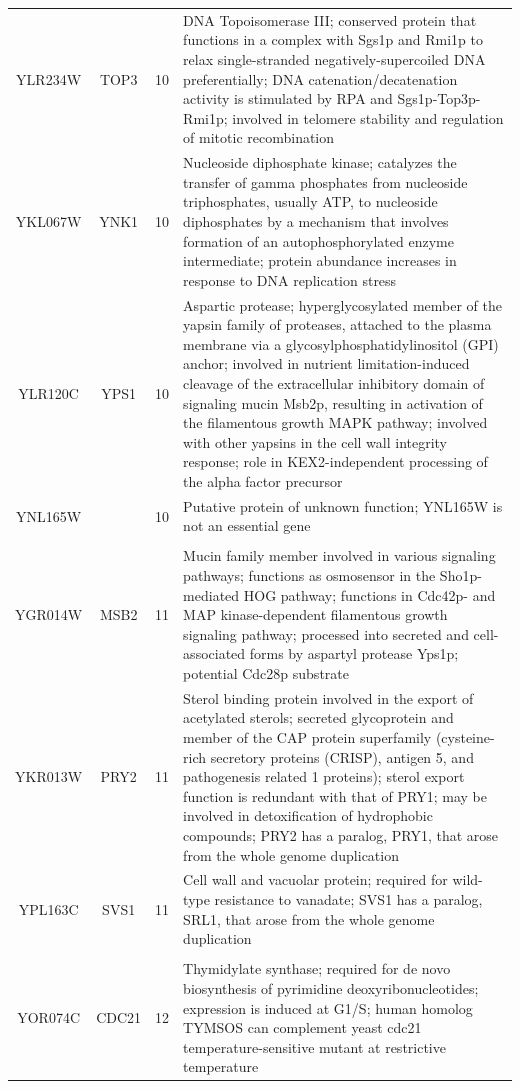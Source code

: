 \documentclass[]{article}
\begin{document}
\begin{longtable}{@{\extracolsep{3pt}} cccp{85mm}}
YLR234W & TOP3 & 10 & DNA Topoisomerase III; conserved protein that functions in a complex with Sgs1p and Rmi1p to relax single-stranded negatively-supercoiled DNA preferentially; DNA catenation/decatenation activity is stimulated by RPA and Sgs1p-Top3p-Rmi1p; involved in telomere stability and regulation of mitotic recombination \\ 
YKL067W & YNK1 & 10 & Nucleoside diphosphate kinase; catalyzes the transfer of gamma phosphates from nucleoside triphosphates, usually ATP, to nucleoside diphosphates by a mechanism that involves formation of an autophosphorylated enzyme intermediate; protein abundance increases in response to DNA replication stress \\ 
YLR120C & YPS1 & 10 & Aspartic protease; hyperglycosylated member of the yapsin family of proteases, attached to the plasma membrane via a glycosylphosphatidylinositol (GPI) anchor; involved in nutrient limitation-induced cleavage of the extracellular inhibitory domain of signaling mucin Msb2p, resulting in activation of the filamentous growth MAPK pathway; involved with other yapsins in the cell wall integrity response; role in KEX2-independent processing of the alpha factor precursor \\ 
YNL165W &  & 10 & Putative protein of unknown function; YNL165W is not an essential gene \\   \hline \\ [-1.8ex] 
YGR014W & MSB2 & 11 & Mucin family member involved in various signaling pathways; functions as osmosensor in the Sho1p-mediated HOG pathway; functions in Cdc42p- and MAP kinase-dependent filamentous growth signaling pathway; processed into secreted and cell-associated forms by aspartyl protease Yps1p; potential Cdc28p substrate \\ 
YKR013W & PRY2 & 11 & Sterol binding protein involved in the export of acetylated sterols; secreted glycoprotein and member of the CAP protein superfamily (cysteine-rich secretory proteins (CRISP), antigen 5, and pathogenesis related 1 proteins); sterol export function is redundant with that of PRY1; may be involved in detoxification of hydrophobic compounds; PRY2 has a paralog, PRY1, that arose from the whole genome duplication \\ 
YPL163C & SVS1 & 11 & Cell wall and vacuolar protein; required for wild-type resistance to vanadate; SVS1 has a paralog, SRL1, that arose from the whole genome duplication \\   \hline \\ [-1.8ex] 
YOR074C & CDC21 & 12 & Thymidylate synthase; required for de novo biosynthesis of pyrimidine deoxyribonucleotides; expression is induced at G1/S; human homolog TYMSOS can complement yeast cdc21 temperature-sensitive mutant at restrictive temperature \\ 

\end{longtable}
\end{document}
